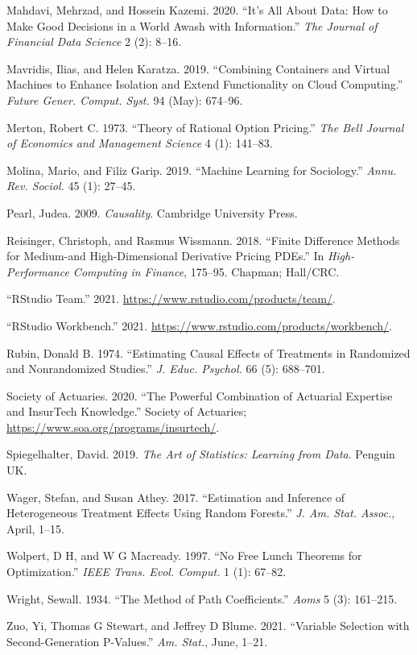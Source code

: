\documentclass{article}
\begin{document}
\leavevmode\hypertarget{ref-Mahdavi2020}{}%
Mahdavi, Mehrzad, and Hossein Kazemi. 2020. ``It's All About Data: How
to Make Good Decisions in a World Awash with Information.'' \emph{The
Journal of Financial Data Science} 2 (2): 8--16.

\leavevmode\hypertarget{ref-Mavridis2019}{}%
Mavridis, Ilias, and Helen Karatza. 2019. ``Combining Containers and
Virtual Machines to Enhance Isolation and Extend Functionality on Cloud
Computing.'' \emph{Future Gener. Comput. Syst.} 94 (May): 674--96.

\leavevmode\hypertarget{ref-Merton1973}{}%
Merton, Robert C. 1973. ``Theory of Rational Option Pricing.'' \emph{The
Bell Journal of Economics and Management Science} 4 (1): 141--83.

\leavevmode\hypertarget{ref-Molina2019}{}%
Molina, Mario, and Filiz Garip. 2019. ``Machine Learning for
Sociology.'' \emph{Annu. Rev. Sociol.} 45 (1): 27--45.

\leavevmode\hypertarget{ref-Pearl2009}{}%
Pearl, Judea. 2009. \emph{Causality}. Cambridge University Press.

\leavevmode\hypertarget{ref-Reisinger2018}{}%
Reisinger, Christoph, and Rasmus Wissmann. 2018. ``Finite Difference
Methods for Medium-and High-Dimensional Derivative Pricing PDEs.'' In
\emph{High-Performance Computing in Finance}, 175--95. Chapman;
Hall/CRC.

\leavevmode\hypertarget{ref-RStudioT2021}{}%
``RStudio Team.'' 2021. \url{https://www.rstudio.com/products/team/}.

\leavevmode\hypertarget{ref-RStudioW2021}{}%
``RStudio Workbench.'' 2021.
\url{https://www.rstudio.com/products/workbench/}.

\leavevmode\hypertarget{ref-Rubin1974}{}%
Rubin, Donald B. 1974. ``Estimating Causal Effects of Treatments in
Randomized and Nonrandomized Studies.'' \emph{J. Educ. Psychol.} 66 (5):
688--701.

\leavevmode\hypertarget{ref-SOA2020}{}%
Society of Actuaries. 2020. ``The Powerful Combination of Actuarial
Expertise and InsurTech Knowledge.'' Society of Actuaries;
\url{https://www.soa.org/programs/insurtech/}.

\leavevmode\hypertarget{ref-Spiegelhalter2019}{}%
Spiegelhalter, David. 2019. \emph{The Art of Statistics: Learning from
Data}. Penguin UK.

\leavevmode\hypertarget{ref-Wager2017}{}%
Wager, Stefan, and Susan Athey. 2017. ``Estimation and Inference of
Heterogeneous Treatment Effects Using Random Forests.'' \emph{J. Am.
Stat. Assoc.}, April, 1--15.

\leavevmode\hypertarget{ref-Wolpert1997}{}%
Wolpert, D H, and W G Macready. 1997. ``No Free Lunch Theorems for
Optimization.'' \emph{IEEE Trans. Evol. Comput.} 1 (1): 67--82.

\leavevmode\hypertarget{ref-Wright1934}{}%
Wright, Sewall. 1934. ``The Method of Path Coefficients.'' \emph{Aoms} 5
(3): 161--215.

\leavevmode\hypertarget{ref-Zuo2021}{}%
Zuo, Yi, Thomas G Stewart, and Jeffrey D Blume. 2021. ``Variable
Selection with Second-Generation P-Values.'' \emph{Am. Stat.}, June,
1--21.



\end{document}
